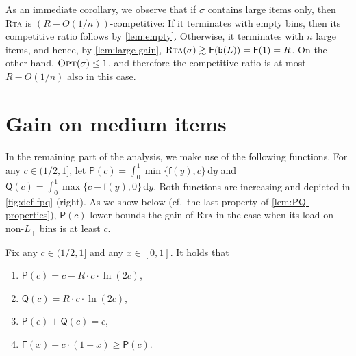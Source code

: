 \documentclass[a4paper,USenglish,cleveref]{lipics-v2019}
\newcommand{\R}{\ensuremath{R}}
\newcommand{\LG}{\ensuremath{L}\xspace}
\newcommand{\LT}{\ensuremath{L_+}\xspace}
\newcommand{\f}{\textsf{f}}
\newcommand{\fintegral}{\textsf{F}}
\newcommand{\water}{\textsf{Q}}
\newcommand{\cutintegral}{\textsf{P}}
\newcommand{\B}{\textsf{b}}
\newcommand{\dd}{\mathrm{d}}
\newcommand{\ALG}{\textsc{Rta}\xspace}
\newcommand{\OPT}{\textsc{Opt}\xspace}
\begin{document}
As an immediate corollary, we observe that if $\sigma$ contains large
items only, then \ALG is $(R - O(1/n))$-competitive: If it terminates with empty
bins, then its competitive ratio follows by \cref{lem:empty}. Otherwise, it
terminates with $n$ large items, and hence, by \cref{lem:large-gain}, $\ALG(\sigma) \gtrsim
\fintegral(\B(\LG)) = \fintegral(1) = \R$. On the other hand, $\OPT(\sigma) \leq 1$, and
therefore the competitive ratio is at most $R - O(1/n)$ also in this case.




\section{Gain on medium items}
\label{sec:medium}


In the remaining part of the analysis, we make use of the following functions.
For any $c \in (1/2, 1]$, let $\cutintegral(c) = \int_0^1 \min \{ \f(y), c \}\,
\dd y$ and $\water(c) = \int_0^1 \max \{ c - \f(y), 0 \}\, \dd y$. Both
functions are increasing and depicted in \cref{fig:def-fpq} (right).
As we show below (cf.~the last property of \cref{lem:PQ-properties}),
$\cutintegral(c)$ lower-bounds the gain of \ALG in the case when
its load on non-\LT bins is at least $c$.

\begin{lemma}
\label{lem:PQ-properties}
Fix any $c \in (1/2, 1]$ and any $x \in [0,1]$. It holds that 
\begin{enumerate}
\item $\cutintegral(c) = c - \R \cdot c \cdot \ln (2 c)$,
\item $\water(c) = \R \cdot c \cdot \ln(2 c)$, 
\item $\cutintegral(c) + \water(c) = c$,
\item $\fintegral(x) + c \cdot (1 - x) \geq \cutintegral(c)$.
\end{enumerate}
\end{lemma}
\end{document}
